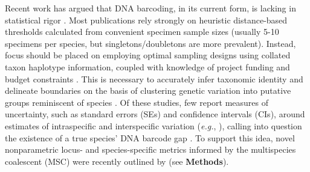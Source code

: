 \documentclass[12pt]{article}
\begin{document}
Recent work has argued that DNA barcoding, in its current form, is lacking in statistical rigor \citep{phillips2022lack}. Most publications rely strongly on heuristic distance-based thresholds calculated from convenient specimen sample sizes (usually 5-10 specimens per species, but singletons/doubletons are more prevalent). Instead, focus should be placed on employing optimal sampling designs using collated taxon haplotype information, coupled with knowledge of project funding and budget constraints \citep{phillips2015exploration, phillips2019incomplete, phillips2020hacsim}. This is necessary to accurately infer taxonomic identity and delineate boundaries on the basis of clustering genetic variation into putative groups reminiscent of species \citep{ phillips2022lack}. Of these studies, few report measures of uncertainty, such as standard errors (SEs) and confidence intervals (CIs), around estimates of intraspecific and interspecific variation (\textit{e.g.}, \citet{wiemers2007does}), calling into question the existence of a true species' DNA barcode gap \citep{candek2015dna, phillips2022lack}. To support this idea, novel nonparametric locus- and species-specific metrics informed by the multispecies coalescent (MSC) were recently outlined by \citet{phillips2024measure} (see \textbf{Methods}). 
\end{document}
